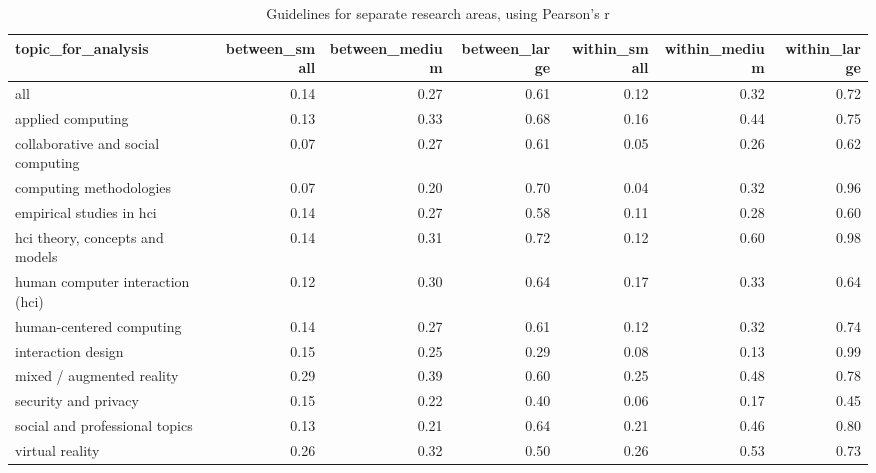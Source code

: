 \begin{table}[ht]
\centering
\begin{tabular}{lrrrrrr}
  \hline
topic\_for\_analysis & between\_small & between\_medium & between\_large & within\_small & within\_medium & within\_large \\ 
  \hline
all & 0.14 & 0.27 & 0.61 & 0.12 & 0.32 & 0.72 \\ 
  applied computing & 0.13 & 0.33 & 0.68 & 0.16 & 0.44 & 0.75 \\ 
  collaborative and social computing & 0.07 & 0.27 & 0.61 & 0.05 & 0.26 & 0.62 \\ 
  computing methodologies & 0.07 & 0.20 & 0.70 & 0.04 & 0.32 & 0.96 \\ 
  empirical studies in hci & 0.14 & 0.27 & 0.58 & 0.11 & 0.28 & 0.60 \\ 
  hci theory, concepts and models & 0.14 & 0.31 & 0.72 & 0.12 & 0.60 & 0.98 \\ 
  human computer interaction (hci) & 0.12 & 0.30 & 0.64 & 0.17 & 0.33 & 0.64 \\ 
  human-centered computing & 0.14 & 0.27 & 0.61 & 0.12 & 0.32 & 0.74 \\ 
  interaction design & 0.15 & 0.25 & 0.29 & 0.08 & 0.13 & 0.99 \\ 
  mixed / augmented reality & 0.29 & 0.39 & 0.60 & 0.25 & 0.48 & 0.78 \\ 
  security and privacy & 0.15 & 0.22 & 0.40 & 0.06 & 0.17 & 0.45 \\ 
  social and professional topics & 0.13 & 0.21 & 0.64 & 0.21 & 0.46 & 0.80 \\ 
  virtual reality & 0.26 & 0.32 & 0.50 & 0.26 & 0.53 & 0.73 \\ 
   \hline
\end{tabular}
\caption{Guidelines for separate research areas, using Pearson's r} 
\label{tab:es guidelines r-es different topics}
\end{table}

